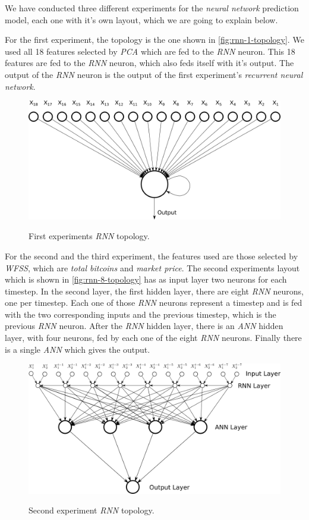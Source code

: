 We have conducted three different experiments for the \textit{neural
network} prediction model, each one with it's own layout, which we are
going to explain below.

For the first experiment, the topology is the one shown in
\autoref{fig:rnn-1-topology}. We used all 18 features selected by
\textit{PCA} which are fed to the \textit{RNN} neuron. This 18
features are fed to the \textit{RNN} neuron, which also feds itself
with it's output. The output of the \textit{RNN} neuron is the output
of the first experiment's \textit{recurrent neural network}.

\begin{figure}[bth] \myfloatalign
  {
    \includegraphics[width=1\linewidth]
    {gfx/rnn_1_topology}
  }
  \caption{First experiments \textit{RNN} topology.}
  \label{fig:rnn-1-topology}
\end{figure}

For the second and the third experiment, the features used are those
selected by \textit{WFSS}, which are \textit{total bitcoins} and
\textit{market price}. The second experiments layout which is shown in
\autoref{fig:rnn-8-topology} has as input layer two neurons for each
timestep. In the second layer, the first hidden layer, there are eight
\textit{RNN} neurons, one per timestep. Each one of those \textit{RNN}
neurons represent a timestep and is fed with the two corresponding
inputs and the previous timestep, which is the previous \textit{RNN}
neuron. After the \textit{RNN} hidden layer, there is an \textit{ANN}
hidden layer, with four neurons, fed by each one of the eight
\textit{RNN} neurons. Finally there is a single \textit{ANN} which
gives the output.

\begin{figure}[bth]
  \myfloatalign
  {
    \includegraphics[width=1\linewidth]
    {gfx/rnn_8_topology}}
  \caption{Second experiment \textit{RNN} topology.}
  \label{fig:rnn-8-topology}
\end{figure}

